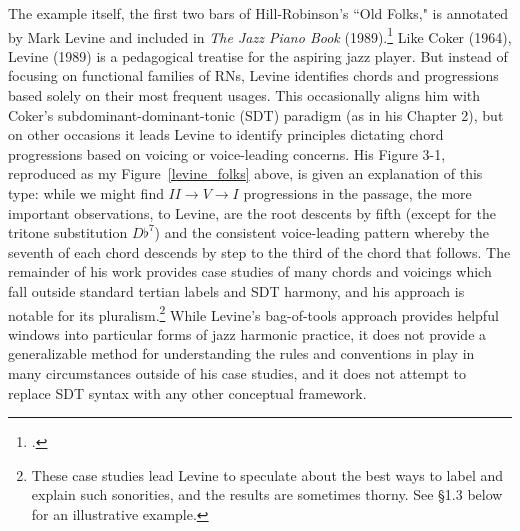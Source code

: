 The example itself, the first two bars of Hill-Robinson's ``Old Folks," is annotated by Mark Levine and included in \emph{The Jazz Piano Book} (1989).\footnote{\cite{levine1989}.}  Like Coker (1964), Levine (1989) is a pedagogical treatise for the aspiring jazz player.  But instead of focusing on functional families of RNs, Levine identifies chords and progressions based solely on their most frequent usages.  This occasionally aligns him with Coker's subdominant-dominant-tonic (SDT) paradigm (as in his Chapter 2), but on other occasions it leads Levine to identify principles dictating chord progressions based on voicing or voice-leading concerns.  His Figure 3-1, reproduced as my Figure~\ref{levine_folks} above, is given an explanation of this type: while we might find $II \rightarrow V \rightarrow I$ progressions in the passage, the more important observations, to Levine, are the root descents by fifth (except for the tritone substitution $D\flat^7$) and the consistent voice-leading pattern whereby the seventh of each chord descends by step to the third of the chord that follows.  The remainder of his work provides case studies of many chords and voicings which fall outside standard tertian labels and SDT harmony, and his approach is notable for its pluralism.\footnote{These case studies lead Levine to speculate about the best ways to label and explain such sonorities, and the results are sometimes thorny.  See \S 1.3 below for an illustrative example.}  While Levine's bag-of-tools approach provides helpful windows into particular forms of jazz harmonic practice, it does not provide a generalizable method for understanding the rules and conventions in play in many circumstances outside of his case studies, and it does not attempt to replace SDT syntax with any other conceptual framework.

